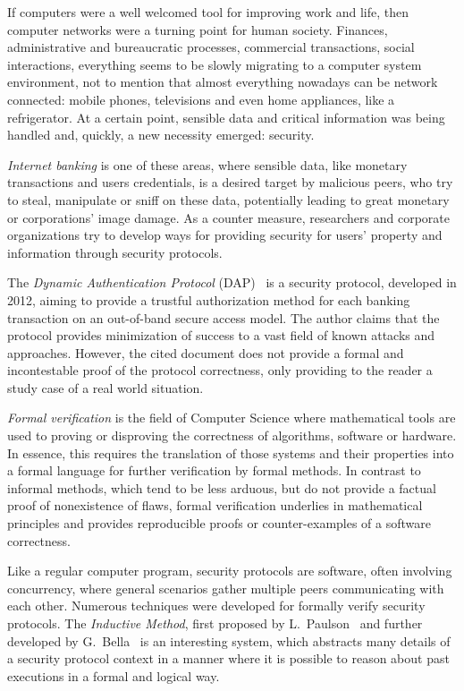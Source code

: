 If computers were a well welcomed tool for improving work and life, then computer networks were a turning point for human society. Finances, administrative and bureaucratic processes, commercial transactions, social interactions, everything seems to be slowly migrating to a computer system environment, not to mention that almost everything nowadays can be network connected: mobile phones, televisions and even home appliances, like a refrigerator. At a certain point, sensible data and critical information was being handled and, quickly, a new necessity emerged: security.

\textit{Internet banking} is one of these areas, where sensible data, like monetary transactions and users credentials, is a desired target by malicious peers, who try to steal, manipulate or sniff on these data, potentially leading to great monetary or corporations' image damage. As a counter measure, researchers and corporate organizations try to develop ways for providing security for users' property and information through security protocols.

The \textit{Dynamic Authentication Protocol} (DAP)~\cite{Peotta2012} is a security protocol, developed in 2012, aiming to provide a trustful authorization method for each banking transaction on an out-of-band secure access model. The author claims that the protocol provides minimization of success to a vast field of known attacks and approaches. However, the cited document does not provide a formal and incontestable proof of the protocol correctness, only providing to the reader a study case of a real world situation.

\textit{Formal verification} is the field of Computer Science where mathematical tools are used to proving or disproving the correctness of algorithms, software or hardware. In essence, this requires the translation of those systems and their properties into a formal language for further verification by formal methods. In contrast to informal methods, which tend to be less arduous, but do not provide a factual proof of nonexistence of flaws, formal verification underlies in mathematical principles and provides reproducible proofs or counter-examples of a software correctness.

Like a regular computer program, security protocols are software, often involving concurrency, where general scenarios gather multiple peers communicating with each other. Numerous techniques were developed for formally verify security protocols. The \textit{Inductive Method}, first proposed by L.~Paulson~\cite{Paulson98} and further developed by G.~Bella~\cite{Bella2007} is an interesting system, which abstracts many details of a security protocol context in a manner where it is possible to reason about past executions in a formal and logical way.

